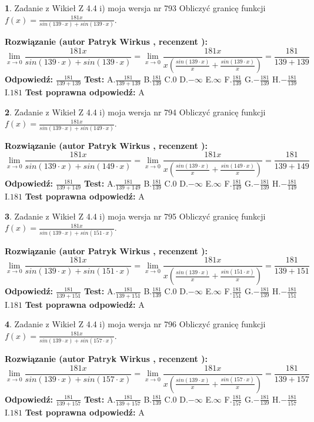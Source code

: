 \documentclass[12pt, a4paper]{article}
\theoremstyle{definition} %
\newtheorem{zad}{}
\newcommand{\zadStart}[1]{\begin{zad}#1\newline}
\newcommand{\zadStop}{\end{zad}}
\newcommand{\rozwStart}[2]{\noindent \textbf{Rozwiązanie (autor #1 , recenzent #2): }\newline}
\newcommand{\rozwStop}{\newline}
\newcommand{\odpStart}{\noindent \textbf{Odpowiedź:}\newline}
\newcommand{\odpStop}{\newline}
\newcommand{\testStart}{\noindent \textbf{Test:}\newline}
\newcommand{\testStop}{\newline}
\newcommand{\kluczStart}{\noindent \textbf{Test poprawna odpowiedź:}\newline}
\newcommand{\kluczStop}{\newline}
\begin{document}
\zadStart{Zadanie z Wikieł Z 4.4 i) moja wersja nr 793}
Obliczyć granicę funkcji $f(x)=\frac{181x}{sin(139\cdot x) +sin(139\cdot x)}$.
\zadStop
\rozwStart{Patryk Wirkus}{}
$$\lim\limits_{x\to 0}\frac{181x}{sin(139\cdot x) +sin(139\cdot x)}=\lim\limits_{x\to 0}\frac{181x}{x(\frac{sin(139\cdot x)}{x}+\frac{sin(139\cdot x)}{x})}=\frac{181}{139+139}$$
\rozwStop
\odpStart
$\frac{181}{139+139}$
\odpStop
\testStart
A.$\frac{181}{139+139}$
B.$\frac{181}{139}$
C.$0$
D.$-\infty$
E.$\infty$
F.$\frac{181}{139}$
G.$-\frac{181}{139}$
H.$-\frac{181}{139}$
I.$181$
\testStop
\kluczStart
A
\kluczStop



\zadStart{Zadanie z Wikieł Z 4.4 i) moja wersja nr 794}
Obliczyć granicę funkcji $f(x)=\frac{181x}{sin(139\cdot x) +sin(149\cdot x)}$.
\zadStop
\rozwStart{Patryk Wirkus}{}
$$\lim\limits_{x\to 0}\frac{181x}{sin(139\cdot x) +sin(149\cdot x)}=\lim\limits_{x\to 0}\frac{181x}{x(\frac{sin(139\cdot x)}{x}+\frac{sin(149\cdot x)}{x})}=\frac{181}{139+149}$$
\rozwStop
\odpStart
$\frac{181}{139+149}$
\odpStop
\testStart
A.$\frac{181}{139+149}$
B.$\frac{181}{139}$
C.$0$
D.$-\infty$
E.$\infty$
F.$\frac{181}{149}$
G.$-\frac{181}{139}$
H.$-\frac{181}{149}$
I.$181$
\testStop
\kluczStart
A
\kluczStop



\zadStart{Zadanie z Wikieł Z 4.4 i) moja wersja nr 795}
Obliczyć granicę funkcji $f(x)=\frac{181x}{sin(139\cdot x) +sin(151\cdot x)}$.
\zadStop
\rozwStart{Patryk Wirkus}{}
$$\lim\limits_{x\to 0}\frac{181x}{sin(139\cdot x) +sin(151\cdot x)}=\lim\limits_{x\to 0}\frac{181x}{x(\frac{sin(139\cdot x)}{x}+\frac{sin(151\cdot x)}{x})}=\frac{181}{139+151}$$
\rozwStop
\odpStart
$\frac{181}{139+151}$
\odpStop
\testStart
A.$\frac{181}{139+151}$
B.$\frac{181}{139}$
C.$0$
D.$-\infty$
E.$\infty$
F.$\frac{181}{151}$
G.$-\frac{181}{139}$
H.$-\frac{181}{151}$
I.$181$
\testStop
\kluczStart
A
\kluczStop



\zadStart{Zadanie z Wikieł Z 4.4 i) moja wersja nr 796}
Obliczyć granicę funkcji $f(x)=\frac{181x}{sin(139\cdot x) +sin(157\cdot x)}$.
\zadStop
\rozwStart{Patryk Wirkus}{}
$$\lim\limits_{x\to 0}\frac{181x}{sin(139\cdot x) +sin(157\cdot x)}=\lim\limits_{x\to 0}\frac{181x}{x(\frac{sin(139\cdot x)}{x}+\frac{sin(157\cdot x)}{x})}=\frac{181}{139+157}$$
\rozwStop
\odpStart
$\frac{181}{139+157}$
\odpStop
\testStart
A.$\frac{181}{139+157}$
B.$\frac{181}{139}$
C.$0$
D.$-\infty$
E.$\infty$
F.$\frac{181}{157}$
G.$-\frac{181}{139}$
H.$-\frac{181}{157}$
I.$181$
\testStop
\kluczStart
A
\kluczStop
\end{document}
